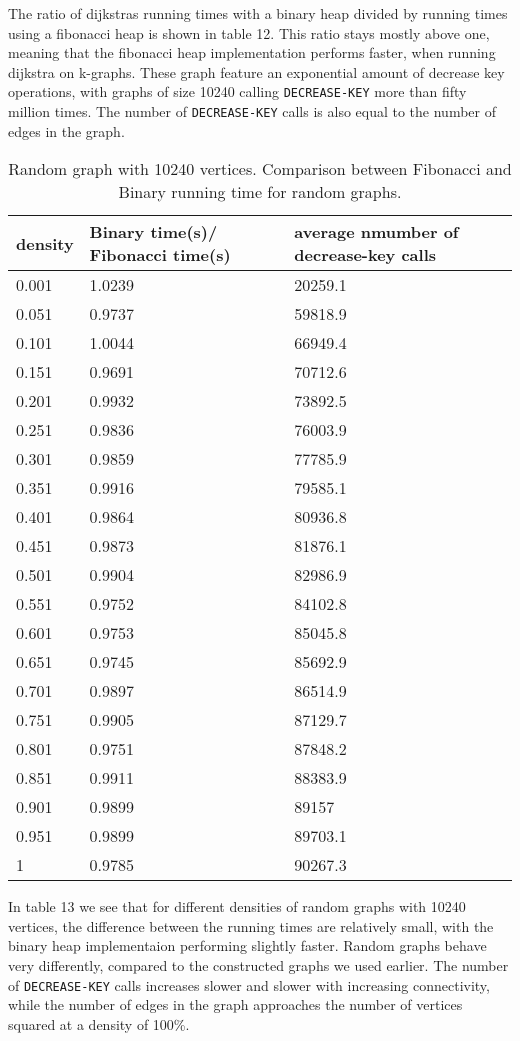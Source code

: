 \documentclass[a4paper,10pt]{article}
\begin{document}
The ratio of dijkstras running times with a binary heap divided by running times using a fibonacci heap is shown in table 12. This ratio stays mostly above one, meaning that the fibonacci heap implementation performs faster, when running dijkstra on k-graphs. These graph feature an exponential amount of decrease key operations, with graphs of size 10240 calling \texttt{DECREASE\--KEY} more than fifty million times. The number of \texttt{DECREASE\--KEY} calls is also equal to the number of edges in the graph. 

\begin{table}
  \begin{center}
    \begin{tabular}{l|l|l}
      density & Binary time(s)/ Fibonacci time(s) & average nmumber of decrease-key calls \\
      \hline
      0.001 & 1.0239 & 20259.1\\
      0.051	& 0.9737 & 59818.9\\
      0.101	& 1.0044 & 66949.4\\
      0.151	& 0.9691 & 70712.6\\
      0.201	& 0.9932 & 73892.5\\
      0.251	& 0.9836 & 76003.9\\
      0.301	& 0.9859 & 77785.9\\
      0.351	& 0.9916 & 79585.1\\
      0.401	& 0.9864 & 80936.8\\
      0.451	& 0.9873 & 81876.1\\
      0.501	& 0.9904 & 82986.9\\
      0.551	& 0.9752 & 84102.8\\
      0.601	& 0.9753 & 85045.8\\
      0.651	& 0.9745 & 85692.9\\
      0.701	& 0.9897 & 86514.9\\
      0.751	& 0.9905 & 87129.7\\
      0.801	& 0.9751 & 87848.2\\
      0.851	& 0.9911 & 88383.9\\
      0.901	& 0.9899 & 89157  \\
      0.951	& 0.9899 & 89703.1\\
      1		& 0.9785 & 90267.3
    \end{tabular}
    \caption{Random graph with 10240 vertices. Comparison between Fibonacci and Binary running time for random graphs.}
  \end{center}
\end{table}
In table 13 we see that for different densities of random graphs with 10240 vertices, the difference between the running times are relatively small, with the binary heap implementaion performing slightly faster. Random graphs behave very differently, compared to the constructed graphs we used earlier. The number of \texttt{DECREASE\--KEY} calls increases slower and slower with increasing connectivity, while the number of edges in the graph approaches the number of vertices squared at a density of 100\%.
\end{document}
